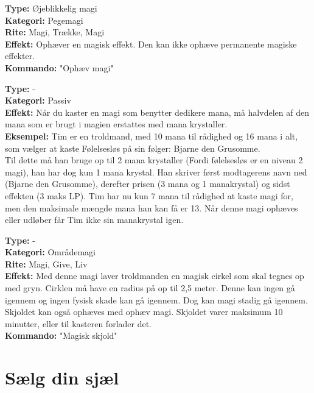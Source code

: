 \begin{primærMagi*}
\textbf{Type:} Øjeblikkelig magi\\
\textbf{Kategori:} Pegemagi\\
\textbf{Rite:} Magi, Trække, Magi\\
\textbf{Effekt:} Ophæver en magisk effekt. Den kan ikke ophæve permanente magiske effekter.\\ 
\textbf{Kommando:} "Ophæv magi"
\end{primærMagi*}

\begin{primærMagi*}
\textbf{Type:} - \\
\textbf{Kategori:} Passiv \\
\textbf{Effekt:} Når du kaster en magi som benytter dedikere mana, må halvdelen af den mana som er brugt i magien erstattes med mana krystaller.\\
\textbf{Eksempel:} Tim er en troldmand, med 10 mana til rådighed og 16 mana i alt, som vælger at kaste Følelsesløs på sin følger: Bjarne den Grusomme.\\ 
Til dette må han bruge op til 2 mana krystaller (Fordi følelsesløs er en niveau 2 magi), han har dog kun 1 mana krystal. Han skriver først modtagerens navn ned (Bjarne den Grusomme), derefter prisen (3 mana og 1 manakrystal) og sidst effekten (3 maks LP).
Tim har nu kun 7 mana til rådighed at kaste magi for, men den maksimale mængde mana han kan få er 13. Når denne magi ophæves eller udløber får Tim ikke sin manakrystal igen.
\end{primærMagi*}

\begin{primærMagi*}
\textbf{Type:} -\\
\textbf{Kategori:} Områdemagi \\
\textbf{Rite:} Magi, Give, Liv \\
\textbf{Effekt:} Med denne magi laver troldmanden en magisk cirkel som skal tegnes op med gryn. Cirklen må have
en radius på op til 2,5 meter. Denne kan ingen gå igennem og ingen fysisk skade kan gå igennem. Dog kan magi stadig gå igennem. Skjoldet kan også ophæves med ophæv magi. Skjoldet varer maksimum 10 minutter, eller til kasteren forlader det. \\
\textbf{Kommando:} "Magisk skjold"
\end{primærMagi*}

\section{Sælg din sjæl}

